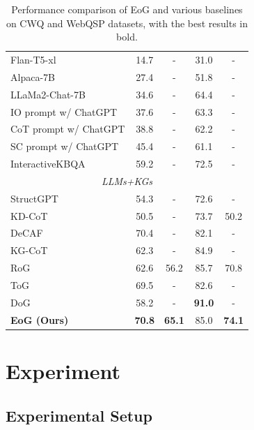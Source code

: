 \documentclass[11pt]{article}
\begin{document}
\begin{table}
{\begin{tabular}{l|cccc}
Flan-T5-xl & 14.7 & - & 31.0 & - \\
Alpaca-7B & 27.4 & - & 51.8 & - \\
LLaMa2-Chat-7B & 34.6 & - & 64.4 & - \\
IO prompt w/ ChatGPT & 37.6 & - & 63.3 & - \\
CoT prompt w/ ChatGPT & 38.8 & - & 62.2 & - \\
SC prompt w/ ChatGPT & 45.4 & - & 61.1 & - \\
InteractiveKBQA & 59.2 & - & 72.5 & - \\ \midrule
\multicolumn{5}{c}{\textit{LLMs+KGs}} \\ \midrule
StructGPT & 54.3 & - & 72.6 & - \\
KD-CoT & 50.5 & - & 73.7 & 50.2 \\
DeCAF & 70.4 & - & 82.1 & - \\
KG-CoT & 62.3 & - & 84.9 & - \\
RoG & 62.6 & 56.2 & 85.7 & 70.8 \\
ToG & 69.5 & - & 82.6 & - \\
DoG & 58.2 & - & \textbf{91.0} & - \\
\textbf{EoG (Ours)} & \textbf{70.8} & \textbf{65.1} & 85.0 & \textbf{74.1} \\ \bottomrule
\end{tabular}
}
\caption{Performance comparison of EoG and various baselines on CWQ and WebQSP datasets, with the best results in bold.}
\label{main result}
\end{table}

\section{Experiment}
\subsection{Experimental Setup}
\end{document}
